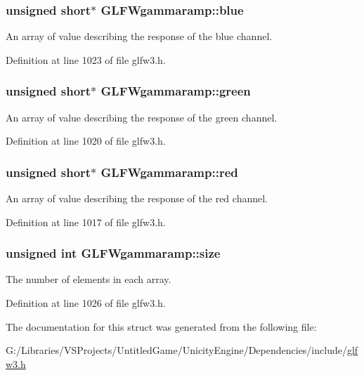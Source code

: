 \subsubsection[{blue}]{\setlength{\rightskip}{0pt plus 5cm}unsigned short$\ast$ G\+L\+F\+Wgammaramp\+::blue}\label{struct_g_l_f_wgammaramp_acf0c836d0efe29c392fe8d1a1042744b}
An array of value describing the response of the blue channel. 

Definition at line 1023 of file glfw3.\+h.

\hypertarget{struct_g_l_f_wgammaramp_affccc6f5df47820b6562d709da3a5a3a}{}
\subsubsection[{green}]{\setlength{\rightskip}{0pt plus 5cm}unsigned short$\ast$ G\+L\+F\+Wgammaramp\+::green}\label{struct_g_l_f_wgammaramp_affccc6f5df47820b6562d709da3a5a3a}
An array of value describing the response of the green channel. 

Definition at line 1020 of file glfw3.\+h.

\hypertarget{struct_g_l_f_wgammaramp_a2cce5d968734b685623eef913e635138}{}
\subsubsection[{red}]{\setlength{\rightskip}{0pt plus 5cm}unsigned short$\ast$ G\+L\+F\+Wgammaramp\+::red}\label{struct_g_l_f_wgammaramp_a2cce5d968734b685623eef913e635138}
An array of value describing the response of the red channel. 

Definition at line 1017 of file glfw3.\+h.

\hypertarget{struct_g_l_f_wgammaramp_ad620e1cffbff9a32c51bca46301b59a5}{}
\subsubsection[{size}]{\setlength{\rightskip}{0pt plus 5cm}unsigned {\bf int} G\+L\+F\+Wgammaramp\+::size}\label{struct_g_l_f_wgammaramp_ad620e1cffbff9a32c51bca46301b59a5}
The number of elements in each array. 

Definition at line 1026 of file glfw3.\+h.



The documentation for this struct was generated from the following file\+:\begin{DoxyCompactItemize}
\item 
G\+:/\+Libraries/\+V\+S\+Projects/\+Untitled\+Game/\+Unicity\+Engine/\+Dependencies/include/\hyperlink{glfw3_8h}{glfw3.\+h}\end{DoxyCompactItemize}
